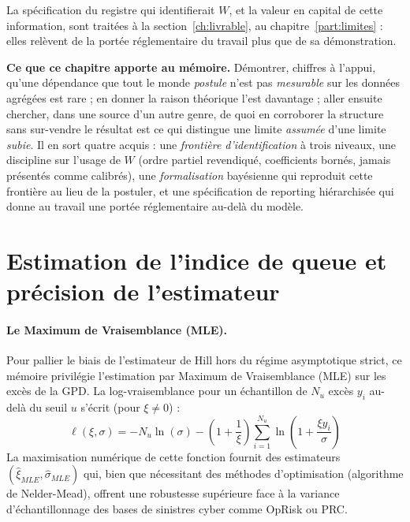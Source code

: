 La spécification du registre qui identifierait $W$, et la valeur en capital de cette
information, sont traitées à la section~\ref{ch:livrable}, au chapitre~\ref{part:limites} : elles
relèvent de la portée réglementaire du travail plus que de sa démonstration.

\begin{cle}
\textbf{Ce que ce chapitre apporte au mémoire.} Démontrer, chiffres à l'appui, qu'une dépendance
que tout le monde \emph{postule} n'est pas \emph{mesurable} sur les données agrégées est rare ;
en donner la raison théorique l'est davantage ; aller ensuite chercher, dans une source d'un
autre genre, de quoi en corroborer la structure sans sur-vendre le résultat est ce qui distingue
une limite \emph{assumée} d'une limite \emph{subie}. Il en sort quatre acquis : une
\emph{frontière d'identification} à trois niveaux, une discipline sur l'usage de $W$
(ordre partiel revendiqué, coefficients bornés, jamais présentés comme calibrés), une
\emph{formalisation} bayésienne qui reproduit cette frontière au lieu de la postuler, et une
spécification de reporting hiérarchisée qui donne au travail une portée réglementaire
au-delà du modèle.
\end{cle}



\section{Estimation de l'indice de queue et précision de l'estimateur}


\paragraph{Le Maximum de Vraisemblance (MLE).}
Pour pallier le biais de l'estimateur de Hill hors du régime asymptotique strict, ce mémoire privilégie l'estimation par Maximum de Vraisemblance (MLE) sur les excès de la GPD. La log-vraisemblance pour un échantillon de $N_u$ excès $y_i$ au-delà du seuil $u$ s'écrit (pour $\xi \neq 0$) :
\begin{equation}
\ell(\xi, \sigma) = -N_u \ln(\sigma) - \left(1 + \frac{1}{\xi}\right) \sum_{i=1}^{N_u} \ln\left(1 + \frac{\xi y_i}{\sigma}\right)
\end{equation}
La maximisation numérique de cette fonction fournit des estimateurs $(\hat{\xi}_{MLE}, \hat{\sigma}_{MLE})$ qui, bien que nécessitant des méthodes d'optimisation (algorithme de Nelder-Mead), offrent une robustesse supérieure face à la variance d'échantillonnage des bases de sinistres cyber comme OpRisk ou PRC.

